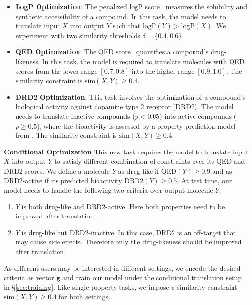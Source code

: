 \documentclass{article} \usepackage{iclr2020_conference,times}
\newcommand{\set}[1]{\{ #1 \}}
\def\vg{{\bm{g}}}
\begin{document}
\begin{itemize}[leftmargin=*,topsep=0pt,itemsep=0pt] 
\item \textbf{LogP Optimization}: The penalized logP score~\citep{kusner2017grammar} measures the solubility and synthetic accessibility of a compound. In this task, the model needs to translate input $X$ into output $Y$ such that $\mathrm{logP}(Y) > \mathrm{logP}(X)$. We experiment with two similarity thresholds $\delta=\set{0.4, 0.6}$.

\item \textbf{QED Optimization}: The QED score~\citep{bickerton2012quantifying} quantifies a compound's drug-likeness. In this task, the model is required to translate molecules with QED scores from the lower range $[0.7, 0.8]$ into the higher range $[0.9,1.0]$. The similarity constraint is $\mathrm{sim}(X,Y) \geq 0.4$.

\item \textbf{DRD2 Optimization}: This task involves the optimization of a compound's biological activity against dopamine type 2 receptor (DRD2). The model needs to translate inactive compounds ($p < 0.05$) into active compounds ($p \geq 0.5$), where the bioactivity is assessed by a property prediction model from \citet{olivecrona2017molecular}. The similarity constraint is $\mathrm{sim}(X,Y) \geq 0.4$.
\end{itemize}

\textbf{Conditional Optimization } This new task requires the model to translate input $X$ into output $Y$ to satisfy different combination of constraints over its QED and DRD2 scores. We define a molecule $Y$ as drug-like if $\mathrm{QED}(Y) \geq 0.9$ and as DRD2-active if its predicted bioactivity $\mathrm{DRD2}(Y) \geq 0.5$. At test time, our model needs to handle the following two criteria over output molecule $Y$:
\begin{enumerate}[leftmargin=*,topsep=0pt,itemsep=0pt] 
    \item $Y$ is both drug-like and DRD2-active. Here both properties need to be improved after translation.
    \item $Y$ is drug-like but DRD2-inactive. In this case, DRD2 is an off-target that may cause side effects. Therefore only the drug-likeness should be improved after translation.
\end{enumerate}
As different users may be interested in different settings, we encode the desired criteria as vector $\vg$ and train our model under the conditional translation setup in \S\ref{sec:training}. 
Like single-property tasks, we impose a similarity constraint $\mathrm{sim}(X,Y) \geq 0.4$ for both settings.
\end{document}
